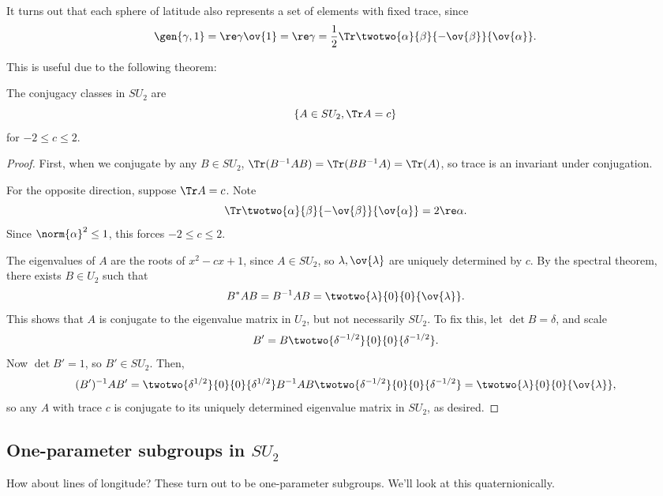 It turns out that each sphere of latitude also represents a set of elements with fixed trace, since
\[\gen{\gamma,1} = \re \gamma \ov{1} = \re \gamma = \frac{1}{2}\Tr \twotwo{\alpha}{\beta}{-\ov{\beta}}{\ov{\alpha}}.\]

This is useful due to the following theorem:

\begin{theorem}
\thmlabel

The conjugacy classes in $SU_2$ are \[\{A\in SU_2, \Tr A = c\}\] for $-2\leq c\leq 2$. 
\end{theorem}

\begin{proof}
First, when we conjugate by any $B\in SU_2$, $\Tr(B^{-1}AB) = \Tr(BB^{-1}A) = \Tr(A)$, so trace is an invariant under conjugation. 

For the opposite direction, suppose $\Tr A = c$. Note
\[\Tr \twotwo{\alpha}{\beta}{-\ov{\beta}}{\ov{\alpha}} = 2\re \alpha.\] 
Since $\norm{\alpha}^2\leq 1$, this forces $-2\leq c\leq 2$.

The eigenvalues of $A$ are the roots of $x^2-cx+1$, since $A\in SU_2$, so $\lambda, \ov{\lambda}$ are uniquely determined by $c$. By the spectral theorem, there exists $B\in U_2$ such that 
\[B^*AB = B^{-1}AB = \twotwo{\lambda}{0}{0}{\ov{\lambda}}.\] 
This shows that $A$ is conjugate to the eigenvalue matrix in $U_2$, but not necessarily $SU_2$. To fix this, let $\det B = \delta$, and scale
\[B' = B\twotwo{\delta^{-1/2}}{0}{0}{\delta^{-1/2}}.\] 
Now $\det B' = 1$, so $B'\in SU_2$. Then,
\[(B')^{-1}AB' = \twotwo{\delta^{1/2}}{0}{0}{\delta^{1/2}} B^{-1}AB\twotwo{\delta^{-1/2}}{0}{0}{\delta^{-1/2}} =\twotwo{\lambda}{0}{0}{\ov{\lambda}},\]
so any $A$ with trace $c$ is conjugate to its uniquely determined eigenvalue matrix in $SU_2$, as desired. 
\end{proof}

\subsection{One-parameter subgroups in $SU_2$}

How about lines of longitude? These turn out to be \ac{one-parameter subgroups}. We'll look at this quaternionically. 

